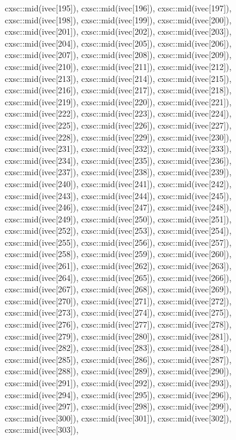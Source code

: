 \begin{DoxyCode}
{  cxsc::mid(ivec[195]),
  cxsc::mid(ivec[196]),
  cxsc::mid(ivec[197]),
  cxsc::mid(ivec[198]),
  cxsc::mid(ivec[199]),
  cxsc::mid(ivec[200]),
  cxsc::mid(ivec[201]),
  cxsc::mid(ivec[202]),
  cxsc::mid(ivec[203]),
  cxsc::mid(ivec[204]),
  cxsc::mid(ivec[205]),
  cxsc::mid(ivec[206]),
  cxsc::mid(ivec[207]),
  cxsc::mid(ivec[208]),
  cxsc::mid(ivec[209]),
  cxsc::mid(ivec[210]),
  cxsc::mid(ivec[211]),
  cxsc::mid(ivec[212]),
  cxsc::mid(ivec[213]),
  cxsc::mid(ivec[214]),
  cxsc::mid(ivec[215]),
  cxsc::mid(ivec[216]),
  cxsc::mid(ivec[217]),
  cxsc::mid(ivec[218]),
  cxsc::mid(ivec[219]),
  cxsc::mid(ivec[220]),
  cxsc::mid(ivec[221]),
  cxsc::mid(ivec[222]),
  cxsc::mid(ivec[223]),
  cxsc::mid(ivec[224]),
  cxsc::mid(ivec[225]),
  cxsc::mid(ivec[226]),
  cxsc::mid(ivec[227]),
  cxsc::mid(ivec[228]),
  cxsc::mid(ivec[229]),
  cxsc::mid(ivec[230]),
  cxsc::mid(ivec[231]),
  cxsc::mid(ivec[232]),
  cxsc::mid(ivec[233]),
  cxsc::mid(ivec[234]),
  cxsc::mid(ivec[235]),
  cxsc::mid(ivec[236]),
  cxsc::mid(ivec[237]),
  cxsc::mid(ivec[238]),
  cxsc::mid(ivec[239]),
  cxsc::mid(ivec[240]),
  cxsc::mid(ivec[241]),
  cxsc::mid(ivec[242]),
  cxsc::mid(ivec[243]),
  cxsc::mid(ivec[244]),
  cxsc::mid(ivec[245]),
  cxsc::mid(ivec[246]),
  cxsc::mid(ivec[247]),
  cxsc::mid(ivec[248]),
  cxsc::mid(ivec[249]),
  cxsc::mid(ivec[250]),
  cxsc::mid(ivec[251]),
  cxsc::mid(ivec[252]),
  cxsc::mid(ivec[253]),
  cxsc::mid(ivec[254]),
  cxsc::mid(ivec[255]),
  cxsc::mid(ivec[256]),
  cxsc::mid(ivec[257]),
  cxsc::mid(ivec[258]),
  cxsc::mid(ivec[259]),
  cxsc::mid(ivec[260]),
  cxsc::mid(ivec[261]),
  cxsc::mid(ivec[262]),
  cxsc::mid(ivec[263]),
  cxsc::mid(ivec[264]),
  cxsc::mid(ivec[265]),
  cxsc::mid(ivec[266]),
  cxsc::mid(ivec[267]),
  cxsc::mid(ivec[268]),
  cxsc::mid(ivec[269]),
  cxsc::mid(ivec[270]),
  cxsc::mid(ivec[271]),
  cxsc::mid(ivec[272]),
  cxsc::mid(ivec[273]),
  cxsc::mid(ivec[274]),
  cxsc::mid(ivec[275]),
  cxsc::mid(ivec[276]),
  cxsc::mid(ivec[277]),
  cxsc::mid(ivec[278]),
  cxsc::mid(ivec[279]),
  cxsc::mid(ivec[280]),
  cxsc::mid(ivec[281]),
  cxsc::mid(ivec[282]),
  cxsc::mid(ivec[283]),
  cxsc::mid(ivec[284]),
  cxsc::mid(ivec[285]),
  cxsc::mid(ivec[286]),
  cxsc::mid(ivec[287]),
  cxsc::mid(ivec[288]),
  cxsc::mid(ivec[289]),
  cxsc::mid(ivec[290]),
  cxsc::mid(ivec[291]),
  cxsc::mid(ivec[292]),
  cxsc::mid(ivec[293]),
  cxsc::mid(ivec[294]),
  cxsc::mid(ivec[295]),
  cxsc::mid(ivec[296]),
  cxsc::mid(ivec[297]),
  cxsc::mid(ivec[298]),
  cxsc::mid(ivec[299]),
  cxsc::mid(ivec[300]),
  cxsc::mid(ivec[301]),
  cxsc::mid(ivec[302]),
  cxsc::mid(ivec[303]),
}
\end{DoxyCode}
